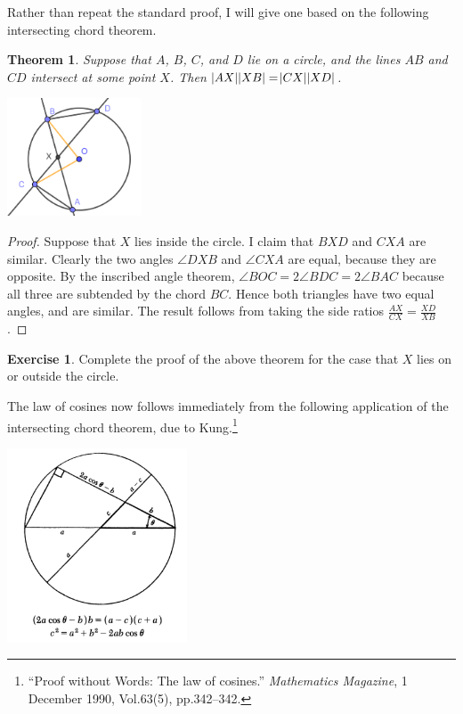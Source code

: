 \documentclass[a4paper,leqno]{article}
\numberwithin{equation}{section}
\newtheorem{thm}[equation]{Theorem}
\theoremstyle{definition}
\newtheorem{exercise}[equation]{Exercise}
\theoremstyle{remark}
\begin{document}
Rather than repeat the standard proof, I will give one based on the following intersecting chord theorem.
\begin{thm}
  Suppose that $ A $, $ B $, $ C $, and $ D $ lie on a circle, and the lines $ AB $ and $ CD $ intersect at
  some point $ X $. Then $ \abs{AX} \abs{XB} = \abs{CX} \abs{XD} $.
\end{thm}
\begin{center}
  \includegraphics[width=0.3\textwidth]{ichords}
\end{center}
\begin{proof}
  Suppose that $ X $ lies inside the circle.
  I claim that $ BXD $ and $ CXA $ are similar. Clearly the two angles $ \angle DXB $ and $ \angle CXA $ are
  equal, because they are opposite. By the inscribed angle theorem, $ \angle BOC = 2\angle BDC = 2\angle BAC $
  because all three are subtended by the chord $ BC $. Hence both triangles have two equal angles, and are similar.
  The result follows from taking the side ratios $ \frac{AX}{CX} = \frac{XD}{XB} $.
\end{proof}

\begin{exercise}
  Complete the proof of the above theorem for the case that $ X $ lies on or outside the circle.
\end{exercise}

The law of cosines now follows immediately from the following application of the intersecting chord theorem,
due to Kung.\footnote{``Proof without Words: The law of cosines.'' \textit{Mathematics Magazine}, 1 December 1990, Vol.63(5), pp.342--342.}
\begin{center}
  \includegraphics[width=0.4\textwidth]{cosinelawproof}
\end{center}
\end{document}
